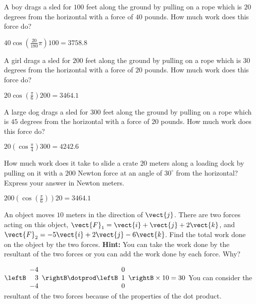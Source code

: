 \begin{enumialphparenastyle}

\begin{ex} A boy drags a sled for $100$ feet along the ground by pulling on a rope
which is $20$ degrees from the horizontal with a force of $40$ pounds. How much
work does this force do?
\begin{sol}
$40\cos \left( \frac{20}{180}\pi \right)100=3758.8 $
\end{sol}
\end{ex}

\begin{ex} A girl drags a sled for $200$ feet along the ground by pulling on a rope
which is $30$ degrees from the horizontal with a force of $20$ pounds. How much
work does this force do?
\begin{sol}
$20\cos \left( \frac{\pi }{6}\right)200= 3464.1$
\end{sol}
\end{ex}

\begin{ex} A large dog drags a sled for $300$ feet along the ground by pulling on a
rope which is $45$ degrees from the horizontal with a force of $20$ pounds. How
much work does this force do?
\begin{sol}
 $20\left( \cos \frac{\pi }{4}\right)300=4242.6$
\end{sol}
\end{ex}

\begin{ex} How much work does it take to slide a crate $20$ meters
along a loading dock by pulling on it with a $200$ Newton force at an angle of
$30^{\circ }$ from the horizontal? Express your answer in Newton meters. 
\begin{sol}
$200\left( \cos \left( \frac{\pi }{6}\right) \right) 20= 3464.1$
\end{sol}
\end{ex}

\begin{ex} An object moves $10$ meters in the direction of $\vect{j}$. There are
two forces acting on this object, $\vect{F}_{1}=\vect{i}+\vect{j}+
2\vect{k}$, and $\vect{F}_{2}=-5\vect{i}+2\vect{j}-6\vect{k}$. Find
the total work done on the object by the two forces. \textbf{Hint: }You can
take the work done by the resultant of the two forces or you can add the
work done by each force. Why?
\begin{sol}
 $\leftB \begin{array}{r}
 -4 \\
3 \\
-4
\end{array}
\rightB \dotprod \leftB \begin{array}{r}
0 \\
1 \\
0
\end{array}
\rightB \times 10= 30$ You can consider the resultant of the
two forces because of the properties of the dot product.
\end{sol}
\end{ex}


\end{enumialphparenastyle}
